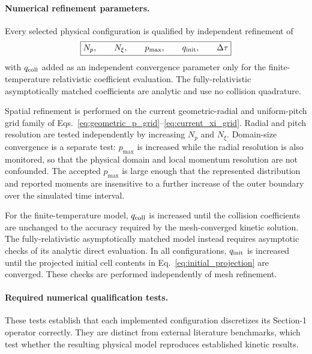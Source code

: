 \documentclass[11pt]{article}
\begin{document}
\paragraph{Numerical refinement parameters.}
Every selected physical configuration is qualified by independent refinement of
\begin{equation}
 \boxed{
 N_p,\qquad N_\xi,\qquad p_{\max},\qquad
 q_{\rm init},\qquad \Delta\tau
 }
 \label{eq:convergence_parameters}
\end{equation}
with $q_{\rm coll}$ added as an independent convergence parameter only for the
finite-temperature relativistic coefficient evaluation.  The fully-relativistic
asymptotically matched coefficients are analytic and use no collision quadrature.

Spatial refinement is performed on the current geometric-radial and uniform-pitch grid
family of Eqs.~\eqref{eq:geometric_p_grid}--\eqref{eq:current_xi_grid}.  Radial and
pitch resolution are tested independently by increasing $N_p$ and $N_\xi$.  Domain-size
convergence is a separate test: $p_{\max}$ is increased while the radial resolution is
also monitored, so that the physical domain and local momentum resolution are not
confounded.  The accepted $p_{\max}$ is
large enough that the represented distribution and reported moments are insensitive to
a further increase of the outer boundary over the simulated time interval.

For the finite-temperature model, $q_{\rm coll}$ is increased until the collision
coefficients are unchanged to the accuracy required by the mesh-converged kinetic
solution.  The fully-relativistic asymptotically matched model instead requires
asymptotic checks of its analytic direct evaluation.  In all configurations, $q_{\rm init}$ is increased
until the projected initial cell contents in Eq.~\eqref{eq:initial_projection} are
converged.  These checks are performed independently of mesh refinement.

\paragraph{Required numerical qualification tests.}
These tests establish that each implemented configuration discretizes its Section-1
operator correctly.  They are distinct from external literature benchmarks, which test
whether the resulting physical model reproduces established kinetic results.
\end{document}
